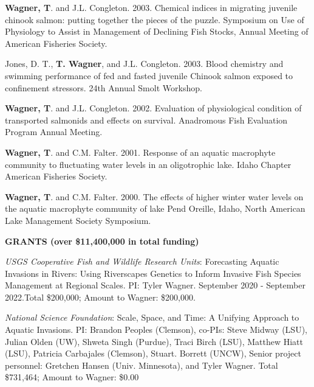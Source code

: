 \documentclass[10pt]{article}
\begin{document}
\begin{flushleft}
\begin{etaremune}
\item {\bf Wagner, T}. and J.L. Congleton. 2003. Chemical indices in migrating juvenile chinook salmon: putting together the pieces of the puzzle. Symposium on Use of Physiology to Assist in Management of Declining Fish Stocks, Annual Meeting of American Fisheries Society.

\item Jones, D. T., {\bf T. Wagner}, and J.L. Congleton. 2003. Blood chemistry and swimming performance of fed and fasted juvenile Chinook salmon exposed to confinement stressors. 24th Annual Smolt Workshop.


\item {\bf Wagner, T}. and J.L. Congleton. 2002. Evaluation of physiological condition of transported salmonids and effects on survival. Anadromous Fish Evaluation Program Annual Meeting.


\item {\bf Wagner, T}. and C.M. Falter. 2001. Response of an aquatic macrophyte community to fluctuating water levels in an oligotrophic lake. Idaho Chapter American Fisheries Society.


\item {\bf Wagner, T}. and C.M. Falter. 2000. The effects of higher winter water levels on the aquatic macrophyte community of lake Pend Oreille, Idaho, North American Lake Management Society Symposium.


\end{etaremune}

\centerline {\bf{GRANTS (over \$11,400,000 in total funding)}}
\vspace{5pt}
\begin{etaremune}

\item \textit{USGS Cooperative Fish and Wildlife Research Units}:  Forecasting Aquatic Invasions in Rivers: Using Riverscapes Genetics to Inform Invasive Fish Species Management at Regional Scales. PI: Tyler Wagner. September 2020 - September 2022.Total \$200,000; Amount to Wagner: \$200,000.  

\item \textit{National Science Foundation}: Scale, Space, and Time: A Unifying Approach to Aquatic Invasions. PI: Brandon Peoples (Clemson), co-PIs: Steve Midway (LSU), Julian Olden (UW), Shweta
 Singh (Purdue), Traci Birch (LSU), Matthew Hiatt (LSU), Patricia Carbajales (Clemson), Stuart. Borrett (UNCW), Senior project personnel: Gretchen Hansen (Univ. Minnesota), and Tyler Wagner. Total \$731,464; Amount to Wagner: \$0.00



\end{etaremune}
\end{flushleft}
\end{document}
